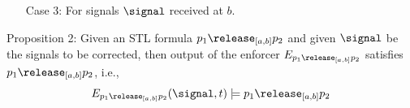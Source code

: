 \begin{enumerate}
\begin{enumerate}
                \item [Case d:] For $\signal$, consider the encoded input event is $\neg p_2 \land \neg p_1$:\\
                As per the semantics of $\varphi_1\until_{[a,b]}\varphi_2$ of STL, $p_1$ should be continuously true for $t \in [a,b) $. However, this case considers $\neg p_1$ being received at $t \in [a, b)$. So, the STL formula is not satisfied by the signal values.\\
                
                $\automaton_{p_1\until_{[a,b]}p_2}$ considering $\neg p_2 \land \neg p_1$ and  $t \in [a,b) $, outputs $\bot_1$, and the enforcer $E_{p_1\until_{[a,b]}p_2}$ reconstructs and outputs the signal $\signal'$, i.e.,
            \begin{equation}    
            \begin{split}
            \label{6}
                \signal \not \models p_1\until_{[a,b]}p_2 \implies \exists\signal', E_{p_1\until_{[a,b]}p_2}(\signal, t)=\signal' : \\(min(|\signal'-\signal|) \land p_1(\signal')=\top  \land (\signal'\models p_1\until_{[a,b]}p_2))
            \end{split}
            \end{equation}  
            From Equations \ref{6},  $E_{p_1\until_{[a,b]}p_2}(\signal, t) \models p_1\until_{[a,b]}p_2$. \\~\\
            
            \end{enumerate}
        

        
        \item [Case 3:] For signals $\signal$ received at $b$.\\
    \end{enumerate}






Proposition 2: Given an STL formula $p_1\release_{[a,b]}p_2$ and given $\signal$ be the signals to be corrected, then output of the enforcer $E_{p_1\release_{[a,b]}p_2}$ satisfies $p_1\release_{[a,b]}p_2$, i.e., 
        \begin{align*}
            E_{p_1\release_{[a,b]}p_2}(\signal, t) \models p_1\release_{[a,b]}p_2
        \end{align*}